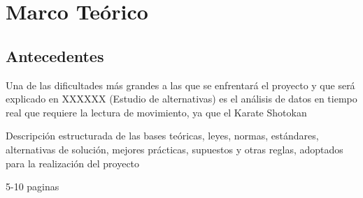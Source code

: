 \chapter{Marco Teórico}

\section{Antecedentes}

Una de las dificultades más grandes a las que se enfrentará el proyecto y que será explicado en XXXXXX (Estudio de alternativas) es el análisis de datos en tiempo real que requiere la lectura de movimiento, ya que el Karate Shotokan


Descripción estructurada de las bases teóricas,
leyes, normas, estándares, alternativas de solución,
mejores prácticas, supuestos y otras reglas,
adoptados para la realización del proyecto

5-10 paginas